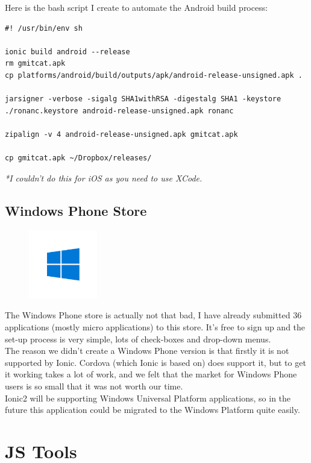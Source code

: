 Here is the bash script I create to automate the Android build process:
\begin{verbatim}
#! /usr/bin/env sh

ionic build android --release
rm gmitcat.apk
cp platforms/android/build/outputs/apk/android-release-unsigned.apk .

jarsigner -verbose -sigalg SHA1withRSA -digestalg SHA1 -keystore ./ronanc.keystore android-release-unsigned.apk ronanc

zipalign -v 4 android-release-unsigned.apk gmitcat.apk

cp gmitcat.apk ~/Dropbox/releases/
\end{verbatim}
\textit{*I couldn't do this for iOS as you need to use XCode.}

\subsection{Windows Phone Store}
\begin{figure}
	\includegraphics[width=3cm]{img/mobile-app/logos/windows.png}
\end{figure} 
The Windows Phone store \cite{windows_phone} is actually not that bad, I have already submitted 36 applications (mostly micro applications) to this store.
It's free to sign up and the set-up process is very simple, lots of check-boxes and drop-down menus.
\\
The reason we didn't create a Windows Phone version is that firstly it is not supported by Ionic. Cordova (which Ionic is based on) does support it, but to get it working takes a lot of work, and we felt that the market for Windows Phone users is so small that it was not worth our time.
\\
Ionic2 will be supporting Windows Universal Platform applications, so in the future this application could be migrated to the Windows Platform quite easily.

\section{JS Tools}
